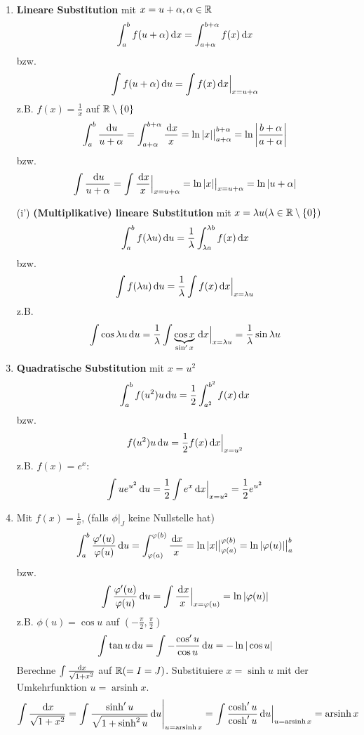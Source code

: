 \begin{example} \
\begin{enumerate}
 \item \textbf{Lineare Substitution} mit $x = u+\alpha, \alpha \in \mathbb{R}$ 
 $$
	\int_a^b f(u+\alpha) \, \mathrm{d} x = \int_{a + \alpha}^{b+ \alpha} f(x) \, \mathrm{d} x
 $$
 bzw. 
 $$
 	\int f( u +\alpha) \, \mathrm{d} u = \int f(x) \, \mathrm{d} x \Big\vert_{x = u + \alpha}
 $$
 z.B. $f(x) = \frac{1}{x}$ auf $\mathbb{R} \setminus \{0\}$
 $$ \int_a^b \frac{\, \mathrm{d} u}{u+\alpha} = \int_{a+\alpha}^{b+\alpha} \frac{\, \mathrm{d} x}{x} = \ln |x| \big\vert^{b+\alpha}_{a+\alpha} = \ln \left| \frac{b+\alpha}{a+\alpha} \right|$$
 bzw.
 $$ \int \frac{\, \mathrm{d} u}{u+\alpha} = \int \frac{\, \mathrm{d} x}{x} \Big\vert_{x= u+\alpha}= \ln |x| \big\vert_{x = u + \alpha} = \ln |u + \alpha|$$
 \item[(i')] \textbf{(Multiplikative) lineare Substitution} mit $x= \lambda u (\lambda \in \mathbb{R} \setminus \{0\})$
 	$$ \int_a^b f(\lambda u) \, \mathrm{d} u = \frac{1}{\lambda} \int_{\lambda a}^{\lambda b} f(x) \, \mathrm{d} x$$ bzw. 
 	$$ \int f(\lambda u) \, \mathrm{d} u = \frac{1}{\lambda} \int f(x) \, \mathrm{d} x \Big\vert_{x = \lambda u}$$
 	z.B.
 $$\int \cos \lambda u \, \mathrm{d} u = \frac{1}{\lambda} \int \underbrace{\cos x}_{\sin' x} \, \mathrm{d} x \Big\vert_{x= \lambda u} = \frac{1}{\lambda} \sin \lambda u$$
 \item \textbf{Quadratische Substitution} mit $x = u^2$
 $$ \int_a^b f(u^2) u \, \mathrm{d} u =\frac{1}{2} \int_{a^2}^{b^2} f(x) \, \mathrm{d} x$$
 bzw.
 $$ f(u^2) u \, \mathrm{d} u = \frac{1}{2} f(x) \, \mathrm{d} x \Big\vert_{x=u^2}$$
 z.B. $f(x) = e^x$:
 $$ \int u  e^{u^2} \, \mathrm{d} u = \frac{1}{2} \int e^x \, \mathrm{d} x \Big\vert_{x=u^2} = \frac{1}{2} e^{u^2}$$
 \item Mit $f(x) = \frac{1}{x}$, (falls $\phi|_J$ keine Nullstelle hat)
 $$ \int_a^b \frac{\varphi'(u)}{\varphi(u)} \, \mathrm{d} u = \int_{\varphi(a)}^{\varphi(b)}\frac{\, \mathrm{d} x}{x} = \ln |x| \big\vert^{\varphi(b)}_{\varphi(a)} = \ln |\varphi(u)| \big\vert_{a}^b$$
 bzw.
 $$ \int \frac{\varphi'(u)}{ \varphi(u)} \, \mathrm{d} u = \int \frac{\, \mathrm{d} x}{x} \Big\vert_{x=\varphi(u)} = \ln | \varphi(u) |$$
 z.B. $\phi(u)= \cos u$ auf $(-\frac{\pi}{2},\frac{\pi}{2})$
 $$\int \tan u \, \mathrm{d} u  = \int -\frac{\cos' u}{\cos u} \, \mathrm{d} u= -\ln |\cos u|$$
 Berechne $\int \frac{\, \mathrm{d} x}{\sqrt{1+x^2}}$ auf $\mathbb{R} (=I =J)$. Substituiere $x=\sinh u$ mit der Umkehrfunktion $u = \operatorname{arsinh} x$.
 $$\int \frac{\, \mathrm{d} x}{\sqrt{1+x^2}} = \int \frac{\sinh' u}{\sqrt{1+\sinh^2 u}} \, \mathrm{d} u \Bigg\vert_{u = \operatorname{arsinh}x}= \int \frac{\cosh' u}{\cosh' u} \, \mathrm{d} u\Big\vert_{u = \operatorname{arsinh}x} = \operatorname{arsinh}x$$
\end{enumerate}
\end{example}